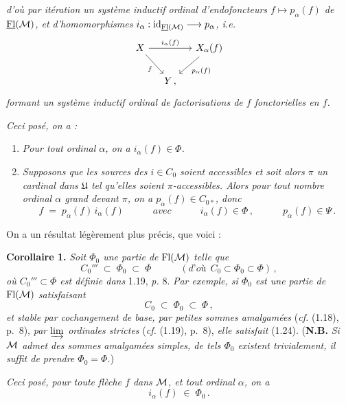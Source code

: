 
{\itshape d'où par itération un système inductif ordinal d'endofoncteurs $f\longmapsto p_\alpha(f)$ de $\underline{\mathrm{Fl}}(\mathcal{M})$, et d'homomorphismes $i_\alpha : \mathrm{id}_{\underline{\mathrm{Fl}}(\mathcal{M})} \longrightarrow p_\alpha$, \textup{i.e.}}
\[
\begin{tikzcd}[column sep=small]
X \arrow[rr, "i_\alpha(f)"] \arrow[dr, "f"'] & & X_\alpha(f) \arrow[dl, "p_\alpha(f)"] \\
& Y\,, &
\end{tikzcd}
\]
{\itshape formant un système inductif ordinal de factorisations de $f$ fonctorielles en $f$.}


{\itshape Ceci posé, on a :}
\begin{enumerate}[label={}, leftmargin=*]
\item[a)] {\itshape Pour tout ordinal $\alpha$, on a $i_\alpha(f)\in\Phi$.}
\item[b)] {\itshape Supposons que les sources des $i\in C_0$ soient accessibles et soit alors $\pi$ un cardinal dans $\mathfrak{U}$ tel qu'elles soient $\pi$-accessibles. Alors pour tout nombre ordinal $\alpha$ grand devant $\pi$, on a $p_\alpha(f)\in C_{0*}$, donc}
\[
f \;=\; p_\alpha(f)\, i_\alpha(f) \qquad\quad \textit{avec} \qquad\quad i_\alpha(f)\in\Phi\,, \qquad\quad p_\alpha(f)\in\Psi\,.
\]
\end{enumerate}

On a un résultat légèrement plus précis, que voici :

\textbf{Corollaire 1.} \textit{Soit $\Phi_0$ une partie de} $\mathrm{Fl}(\mathcal{M})$ \textit{telle que}
\[
C_0''' \;\subset\; \Phi_0 \;\subset\; \Phi \qquad\quad (\textit{d'où}\ \ C_0\subset\Phi_0\subset\Phi)\,,
\tag*{(1.24)}
\]
\textit{où $C_0'''\subset\Phi$ est définie dans} 1.19, \textit{p.} 8. \textit{Par exemple, si $\Phi_0$ est une partie de} $\mathrm{Fl}(\mathcal{M})$ \textit{satisfaisant}
\[
C_0 \;\subset\; \Phi_0 \;\subset\; \Phi\,,
\]
\textit{et stable par cochangement de base, par petites sommes amalgamées} (\textit{cf.} (1.18), p.~8), \textit{par $\varinjlim$ ordinales strictes} (\textit{cf.} (1.19), p.~8), \textit{elle satisfait} (1.24). (\textbf{N.B.} \textit{Si $\mathcal{M}$ admet des sommes amalgamées simples, de tels $\Phi_0$ existent trivialement, il suffit de prendre $\Phi_0=\Phi$.})


\textit{Ceci posé, pour toute flèche $f$ dans $\mathcal{M}$, et tout ordinal $\alpha$, on a}
\[
i_\alpha(f) \;\in\; \Phi_0\,.
\]

